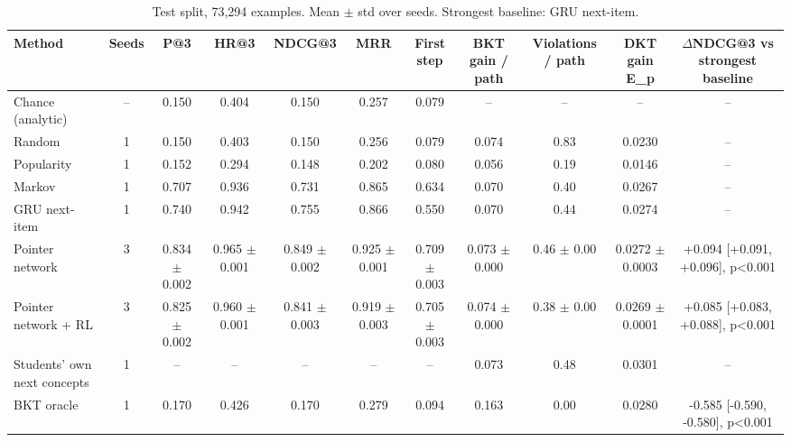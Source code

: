 \begin{table}[t]
\centering\small
\caption{Test split, 73,294 examples. Mean $\pm$ std over seeds. Strongest baseline: GRU next-item.}
\begin{tabular}{lcccccccccc}
\toprule
Method & Seeds & P@3 & HR@3 & NDCG@3 & MRR & First step & BKT gain / path & Violations / path & DKT gain E\_p & $\Delta$NDCG@3 vs strongest baseline \\
\midrule
Chance (analytic) & -- & 0.150 & 0.404 & 0.150 & 0.257 & 0.079 & -- & -- & -- & -- \\
Random & 1 & 0.150 & 0.403 & 0.150 & 0.256 & 0.079 & 0.074 & 0.83 & 0.0230 & -- \\
Popularity & 1 & 0.152 & 0.294 & 0.148 & 0.202 & 0.080 & 0.056 & 0.19 & 0.0146 & -- \\
Markov & 1 & 0.707 & 0.936 & 0.731 & 0.865 & 0.634 & 0.070 & 0.40 & 0.0267 & -- \\
GRU next-item & 1 & 0.740 & 0.942 & 0.755 & 0.866 & 0.550 & 0.070 & 0.44 & 0.0274 & -- \\
Pointer network & 3 & 0.834 $\pm$ 0.002 & 0.965 $\pm$ 0.001 & 0.849 $\pm$ 0.002 & 0.925 $\pm$ 0.001 & 0.709 $\pm$ 0.003 & 0.073 $\pm$ 0.000 & 0.46 $\pm$ 0.00 & 0.0272 $\pm$ 0.0003 & +0.094 [+0.091, +0.096], p<0.001 \\
Pointer network + RL & 3 & 0.825 $\pm$ 0.002 & 0.960 $\pm$ 0.001 & 0.841 $\pm$ 0.003 & 0.919 $\pm$ 0.003 & 0.705 $\pm$ 0.003 & 0.074 $\pm$ 0.000 & 0.38 $\pm$ 0.00 & 0.0269 $\pm$ 0.0001 & +0.085 [+0.083, +0.088], p<0.001 \\
Students' own next concepts & 1 & -- & -- & -- & -- & -- & 0.073 & 0.48 & 0.0301 & -- \\
BKT oracle & 1 & 0.170 & 0.426 & 0.170 & 0.279 & 0.094 & 0.163 & 0.00 & 0.0280 & -0.585 [-0.590, -0.580], p<0.001 \\
\bottomrule
\end{tabular}
\end{table}
